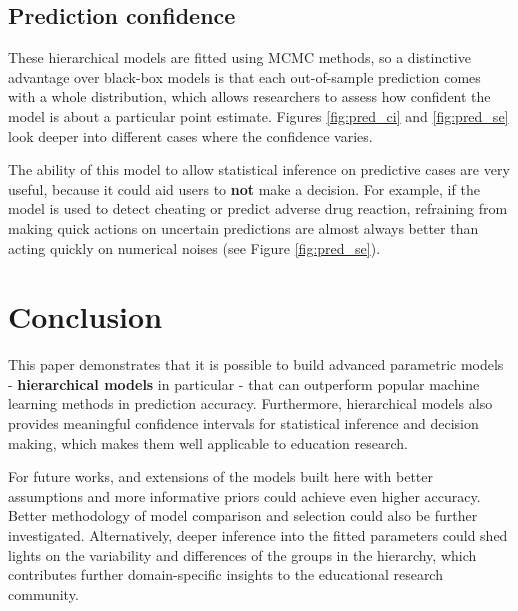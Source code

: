 \documentclass{sigchi}
\begin{document}
\subsection{Prediction confidence}
These hierarchical models are fitted using MCMC methods, so a distinctive advantage over black-box models is that each out-of-sample prediction comes with a whole distribution, which allows researchers to assess how confident the model is about a particular point estimate. Figures \ref{fig:pred_ci} and \ref{fig:pred_se} look deeper into different cases where the confidence varies.

The ability of this model to allow statistical inference on predictive cases are very useful, because it could aid users to \textbf{not} make a decision. For example, if the model is used to detect cheating or predict adverse drug reaction, refraining from making quick actions on uncertain predictions are almost always better than acting quickly on numerical noises (see Figure \ref{fig:pred_se}). 

 

\section{Conclusion}
This paper demonstrates that it is possible to build advanced
parametric models - \textbf{hierarchical models} in particular - that can outperform popular machine learning methods in prediction accuracy. Furthermore, hierarchical models also provides meaningful confidence intervals for statistical inference and decision making, which makes them well applicable to education research.

For future works, and extensions of the models built here with better assumptions and more informative priors could achieve even higher accuracy. Better methodology of model comparison and selection could also be further investigated. Alternatively, deeper inference into the fitted parameters could shed lights on the variability and differences of the groups in the hierarchy, which contributes further domain-specific insights to the educational research community.


\balance{}




\end{document}
